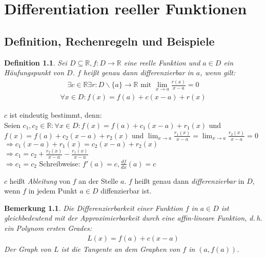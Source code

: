 \documentclass[ngerman,titlepage,twoside, parskip=half*]{scrreprt}
\newcommand*{\R}{\mathbb{R}}
\theoremstyle{break}
\newtheorem{definition}{Definition}[chapter]
\theoremstyle{nonumberbreak}
\newtheorem{remark}{Bemerkung}
\begin{document}
\chapter{Differentiation reeller Funktionen}
\section{Definition, Rechenregeln und Beispiele}

\begin{definition}
Sei $D\subseteq \R, f\colon D\rightarrow\R$ eine reelle Funktion und $a\in D$ ein Häuf\-ungs\-punkt von $D$. $f$
heißt genau dann differenzierbar in $a$, wenn gilt:
\begin{gather*}\exists c \in\R \exists r\colon D\backslash\{a\}\rightarrow\R \text{ mit } \lim_{x\rightarrow a}
\frac{r(x)}{x-a}=0\end{gather*}
\begin{gather*}\forall x \in D\colon f(x)=f(a)+c(x-a)+r(x)\end{gather*}
\end{definition}

$c$ ist eindeutig bestimmt, denn:\\
Seien $c_1,c_2 \in \R\colon \forall x \in D\colon f(x)=f(a)+c_1(x-a)+r_1(x)$ und $f(x)=f(a)+c_2(x-a)+r_2(x)$ und
$\lim_{x\rightarrow a}\frac{r_1(x)}{x-a}=\lim_{x\rightarrow a}\frac{r_2(x)}{x-a}=0$\\
$\Rightarrow c_1(x-a)+r_1(x)=c_2(x-a)+r_2(x)$\\
$\Rightarrow c_1=c_2+\frac{r_2(x)}{x-a}-\frac{r_1(x)}{x-a}$\\
$\Rightarrow c_1=c_2$
Schreibweise: $f'(a)=c, \frac{df}{dx}(a)=c$

$c$ heißt \emph{Ableitung} von $f$ an der Stelle $a$. $f$ heißt genau dann
\emph{differenzierbar} in $D$, wenn $f$ in jedem Punkt $a\in D$ diffenzierbar ist.

\begin{remark}
Die Differenzierbarkeit einer Funktion $f$ in $a\in D$ ist gleich\-be\-deu\-tend mit der Approximierbarkeit
durch eine affin-lineare Funktion, d.\,h. ein Polynom ersten Grades:
\begin{gather*}L(x)=f(a)+c(x-a)\end{gather*}
Der Graph von $L$ ist die Tangente an dem Graphen von $f$ in $(a,f(a))$.
\end{remark}
\end{document}
